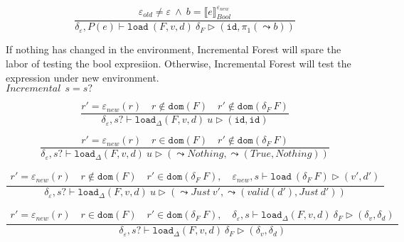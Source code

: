 \documentclass[10pt,twoside,a4paper]{article}
\theoremstyle{theorem}
\theoremstyle{lemma}
\theoremstyle{property}
\theoremstyle{definition}
\theoremstyle{assumption}
\def\fst{\pi_1}
\begin{document}
\begin{displaymath}
	\frac{ \varepsilon_{old} \not= \varepsilon ~\wedge~  b = \llbracket e \rrbracket^{\varepsilon_{new}}_{Bool}}
	{\delta_\varepsilon, P(e) \vdash \mathtt{load}~ (F,v,d) ~\delta_F \rhd (\mathtt{id},\fst(\leadsto b))}
\end{displaymath}

If nothing has changed in the environment, Incremental Forest will spare the labor of testing the bool expresiion. Otherwise, Incremental Forest will test the expression under new environment.\\

$\boxed{Incremental~~s = s?}$

\begin{displaymath}
	\frac{
		r' = \varepsilon_{new}(r) \quad r \notin \mathtt{dom}(F) \quad r' \notin \mathtt{dom}(\delta_F~F)
	}
	{\delta_\varepsilon, s? \vdash \mathtt{load}_\Delta (F,v,d)~ u \rhd (\mathtt{id}, \mathtt{id})}
\end{displaymath}

\begin{displaymath}
	\frac{
		r' = \varepsilon_{new}(r)  \quad r \in \mathtt{dom}(F) \quad r' \notin \mathtt{dom}(\delta_F~F)
	}
	{\delta_\varepsilon, s? \vdash \mathtt{load}_\Delta (F,v,d)~ u \rhd (\leadsto Nothing,\leadsto (True,Nothing))}
\end{displaymath}

\begin{displaymath}
	\frac{\begin{array}{c}
	r' = \varepsilon_{new}(r) \quad r \notin \mathtt{dom}(F) \quad r' \in \mathtt{dom}(\delta_F~F), \quad
		\varepsilon_{new}, s \vdash \mathtt{load}~ (\delta_F~F) \rhd (v',d')
	\end{array}}
	{\delta_\varepsilon, s? \vdash \mathtt{load}_\Delta (F,v,d)~ u \rhd (\leadsto Just~v',\leadsto (valid(d'),Just~d'))}
\end{displaymath}

\begin{displaymath}
	\frac{\begin{array}{c}
	r' = \varepsilon_{new}(r) \quad r \in \mathtt{dom}(F) \quad r' \in \mathtt{dom}(\delta_F~F), \quad
		\delta_\varepsilon, s \vdash \mathtt{load}_\Delta (F,v,d)~ \delta_F \rhd (\delta_v,\delta_d)
	\end{array}}
	{\delta_\varepsilon, s? \vdash \mathtt{load}_\Delta (F,v,d)~ \delta_F \rhd (\delta_v,\delta_d)}
\end{displaymath}
\end{document}
